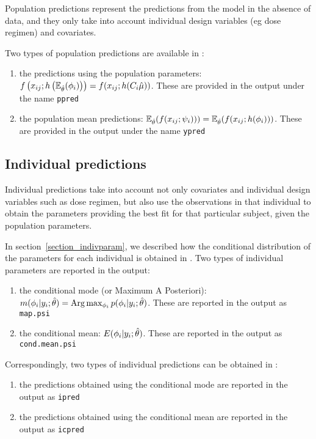 Population predictions represent the predictions from the model in the absence of data, and they only take into account individual design variables (eg dose regimen) and covariates.

Two types of population predictions are available in \saemix:
\begin{enumerate}
  \item the predictions using the population parameters: $f\left(x_{ij} ; h\left( \mathbb{E}_{\hat{\theta}}(\phigi) \right) \right)= f(x_{ij} ; h(C_i \hat{\fixed_effect}))$. These are provided in the output under the name \texttt{ppred}
  \item the population mean predictions:  $\mathbb{E}_{\hat{\theta}}(f(x_{ij} ; {\psi_i}) ))=\mathbb{E}_{\hat{\theta}}(f(x_{ij} ; h({{\phi}_i}) ))$. These are provided in the output under the name \texttt{ypred}
\end{enumerate}

\subsection{Individual predictions}

Individual predictions take into account not only covariates and individual design variables such as dose regimen, but also use the observations in that individual to obtain the parameters providing the best fit for that particular subject, given the population parameters.

In section~\ref{section_indivparam}, we described how the conditional distribution of the parameters for each individual is obtained in \saemix. Two types of individual parameters are reported in the output:
\begin{enumerate}
\item the conditional mode (or Maximum A Posteriori): $ m({{\phi}_i}|y_i;\hat{\theta})={\rm Arg}\max_{{\phi}_i} p({{\phi}_i}|y_i;\hat{\theta})$. These are reported in the output as \texttt{map.psi}
\item the conditional mean: $ E({{\phi}_i}|y_i;\hat{\theta})$. These are reported in the output as \texttt{cond.mean.psi}
\end{enumerate}
Correspondingly, two types of individual predictions can be obtained in \saemix:
\begin{enumerate}
\item the predictions obtained using the conditional mode are reported in the output as \texttt{ipred}
\item the predictions obtained using the conditional mean are reported in the output as \texttt{icpred}
\end{enumerate}

